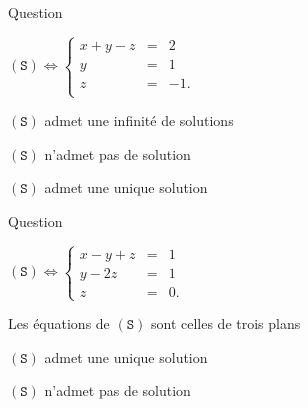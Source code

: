 \begin{multi}[multiple,feedback=
{\[(\mathtt{S}) \Leftrightarrow  \left\{\begin{array}{rcc}
x+y-z&=&2\\
y&=&1\\ 
z&=&-1.\end{array}\right.\] 
Donc \((\mathtt{S})\) admet une unique solution : \((0,1,-1)\).
}]{Question}
    \item* \((\mathtt{S}) \Leftrightarrow  \left\{\begin{array}{rcc}
x+y-z&=&2\\
y&=&1\\
z&=&-1.\\
\end{array}\right.\)
    \item \((\mathtt{S})\) admet une infinité de solutions
    \item \((\mathtt{S})\) n'admet pas de solution
    \item* \((\mathtt{S})\) admet une unique solution
\end{multi}


\begin{multi}[multiple,feedback=
{\[(\mathtt{S}) \Leftrightarrow  \left\{\begin{array}{rcc}
x-y+z&=&1\\
y-2z&=&1\\ 
z&=&0.\\ 
\end{array}\right.\]
Donc \((\mathtt{S})\) admet une unique solution : \((2,1,0)\).
}]{Question}
    \item* \((\mathtt{S}) \Leftrightarrow  \left\{\begin{array}{rcc}
x-y+z&=&1\\
y-2z&=&1\\
z&=&0.\end{array}\right.\)
    \item* Les équations de \((\mathtt{S})\) sont celles de trois plans
    \item* \((\mathtt{S})\) admet une unique solution
    \item \((\mathtt{S})\) n'admet pas de solution
\end{multi}


